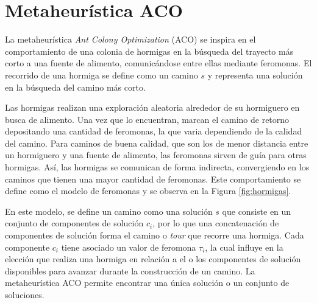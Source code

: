 \section{Metaheur\'istica ACO}
\label{sec:hormigas}
La metaheur\'istica {\it Ant Colony Optimization} (ACO) se inspira en el comportamiento de una colonia de hormigas en la b\'usqueda del trayecto m\'as corto a una fuente de alimento, comunic\'andose entre ellas mediante feromonas. El recorrido de una hormiga se define como un camino $s$ y representa una soluci\'on en la b\'usqueda del camino m\'as corto.

Las hormigas realizan una exploraci\'on aleatoria alrededor de su hormiguero en busca de alimento. Una vez que lo encuentran, marcan el camino de retorno depositando una cantidad de feromonas, la que varia dependiendo de la calidad del camino. Para caminos de buena calidad, que son los de menor distancia entre un hormiguero y una fuente de alimento, las feromonas sirven de guía para otras hormigas. As\'i, las hormigas se comunican de forma indirecta, convergiendo en los caminos que tienen una mayor cantidad de feromonas. Este comportamiento se define como el modelo de feromonas y se observa en la Figura \ref{fig:hormigas}.


En este modelo, se define un camino como una soluci\'on $s$ que consiste en un conjunto de componentes de soluci\'on $c_{i}$, por lo que una concatenaci\'on de componentes de soluci\'on forma el camino o {\it tour} que recorre una hormiga. Cada componente $c_{i}$ tiene asociado un valor de feromona $\tau_i$, la cual influye en la elecci\'on que realiza una hormiga en relaci\'on a el o los componentes de soluci\'on disponibles para avanzar durante la construcci\'on de un camino. La metaheur\'istica ACO permite encontrar una \'unica soluci\'on o un conjunto de soluciones. 


